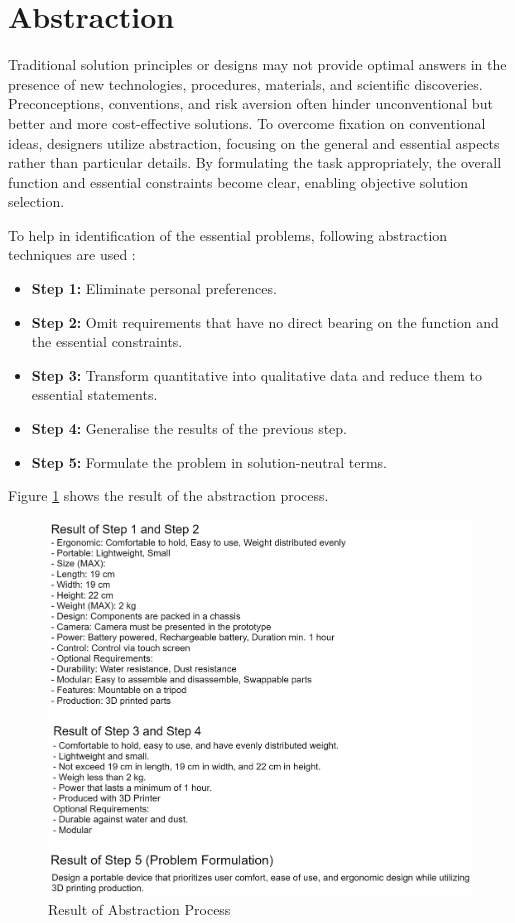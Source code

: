 \section{Abstraction}
Traditional solution principles or designs may not provide optimal answers in the presence of new technologies, procedures, materials, and scientific discoveries. Preconceptions, conventions, and risk aversion often hinder unconventional but better and more cost-effective solutions. To overcome fixation on conventional ideas, designers utilize abstraction, focusing on the general and essential aspects rather than particular details. By formulating the task appropriately, the overall function and essential constraints become clear, enabling objective solution selection. \cite{Pahl07b}

To help in identification of the essential problems, following abstraction techniques are used \cite{Pahl07c}:

\begin{itemize}
    \item \textbf{Step 1:} Eliminate personal preferences.
    \item \textbf{Step 2:} Omit requirements that have no direct bearing on the function and the essential constraints.
    \item \textbf{Step 3:} Transform quantitative into qualitative data and reduce them to essential statements.
    \item \textbf{Step 4:} Generalise the results of the previous step.
    \item \textbf{Step 5:} Formulate the problem in solution-neutral terms.
\end{itemize}

Figure \ref{fig:result-abstraction-process} shows the result of the abstraction process.

\begin{figure}[ht!]
    \centering
    \includegraphics[width=0.8\linewidth]{texs/Part1/chapter3/image/abstractionresult.png}
    \caption{Result of Abstraction Process}
    \label{fig:result-abstraction-process}
\end{figure}


